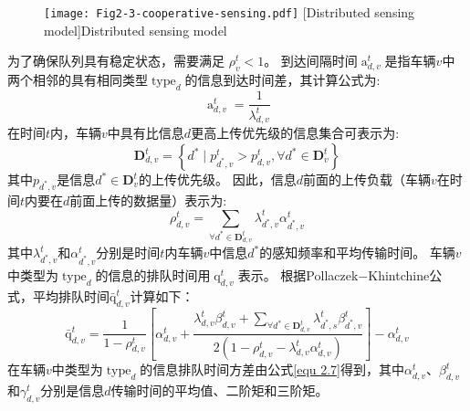 \begin{figure}[h]
\centering
  \texttt{[image: Fig2-3-cooperative-sensing.pdf]}
  [Distributed sensing model]{Distributed sensing model}
  \label{fig 2-3}
\end{figure}

为了确保队列具有稳定状态，需要满足 $\rho_{v}^{t} < 1$。
到达间隔时间$\operatorname{a}_{d, v}^t$是指车辆$v$中两个相邻的具有相同类型$\operatorname{type}_d$的信息到达时间差，其计算公式为:
\begin{equation}
    \operatorname{a}_{d, v}^t=\frac{1}{\lambda_{d, v}^{t}}
\end{equation}
在时间$t$内，车辆$v$中具有比信息$d$更高上传优先级的信息集合可表示为:
\begin{equation}
\mathbf{D}_{d, v}^t=\left\{d^* \mid p_{d^*, v}^t>p_{d, v}^t, \forall d^* \in \mathbf{D}_v^t\right\} 
\end{equation}
其中$p_{d^*, v}$是信息$d^* \in \mathbf{D}_v^t$的上传优先级。
  因此，信息$d$前面的上传负载（车辆$v$在时间$t$内要在$d$前面上传的数据量）表示为:
\begin{equation}
\rho_{d, v}^t=\sum_{\forall d^* \in \mathbf{D}_{d, v}^t} \lambda_{d^*, v}^t \alpha_{d^*, v}^t
\end{equation}
其中$\lambda_{d^*, v}^t$和$\alpha_{d^*, v}^t$分别是时间$t$内车辆$v$中信息$d^*$的感知频率和平均传输时间。
车辆$v$中类型为$\operatorname{type}_d$的信息的排队时间用$\operatorname{q}_{d, v}^t$表示。
根据Pollaczek$-$Khintchine公式\cite{takine2001queue}，平均排队时间$\operatorname{\bar{q}}_{d, v}^t$计算如下：
\begin{equation}
    \operatorname{\bar{q}}_{d, v}^t= \frac{1} {1 - \rho_{d, v}^{t}} 
        \left[ \alpha_{d, v}^t + \frac{ \lambda_{d, v}^{t} \beta_{d, v}^t + \sum\limits_{\forall d^* \in \mathbf{D}_{d, v}^t} \lambda_{d^*,s}^t \beta_{d^*, v}^t }{2\left(1-\rho_{d, v}^{t} - \lambda_{d, v}^{t}  \alpha_{d, v}^t\right)}\right] 
        - \alpha_{d, v}^t
\label{equ 2-6}
\end{equation}
在车辆$v$中类型为$\operatorname{type}_d$的信息排队时间方差由公式\ref{equ 2.7}得到，其中$\alpha_{d, v}^t$、$\beta_{d, v}^t$和$\gamma_{d, v}^t$分别是信息$d$传输时间的平均值、二阶矩和三阶矩。
